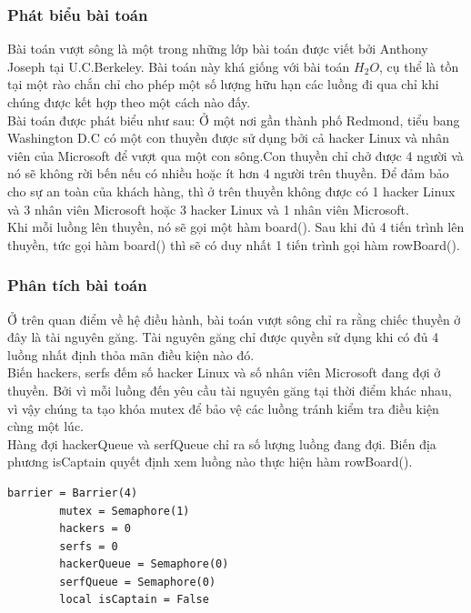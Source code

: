 \documentclass[12pt]{article}
\begin{document}
		\subsubsection{Phát biểu bài toán}
		Bài toán vượt sông là một trong những lớp bài toán được viết bởi Anthony Joseph tại U.C.Berkeley. Bài toán này khá giống với bài toán $H_2O$, cụ thể là tồn tại một rào chắn chỉ cho phép một số lượng hữu hạn các luồng đi qua chỉ khi chúng được kết hợp theo một cách nào đấy.\\
		Bài toán được phát biểu như sau: Ở một nơi gần thành phố Redmond, tiểu bang Washington D.C có một con thuyền được sử dụng bởi cả hacker Linux và nhân viên của Microsoft để vượt qua một con sông.Con thuyền chỉ chở được 4 người và nó sẽ không rời bến nếu có nhiều hoặc ít hơn 4 người trên thuyền. Để đảm bảo cho sự an toàn của khách hàng, thì ở trên thuyền không được có 1 hacker Linux và 3 nhân viên Microsoft hoặc 3 hacker Linux và 1 nhân viên Microsoft.\\
		Khi mỗi luồng lên thuyền, nó sẽ gọi một hàm board(). Sau khi đủ 4 tiến trình lên thuyền, tức gọi hàm board() thì sẽ có duy nhất 1 tiến trình gọi hàm rowBoard().
		\subsubsection{Phân tích bài toán}
		Ở trên quan điểm về hệ điều hành, bài toán vượt sông chỉ ra rằng chiếc thuyền ở đây là tài nguyên găng. Tài nguyên găng chỉ được quyền sử dụng khi có đủ 4 luồng nhất định thỏa mãn điều kiện nào đó.\\
		Biến hackers, serfs đếm số hacker Linux và số nhân viên Microsoft đang đợi ở thuyền. Bởi vì mỗi luồng đến yêu cầu tài nguyên găng tại thời điểm khác nhau, vì vậy chúng ta tạo khóa mutex để bảo vệ các luồng tránh kiểm tra điều kiện cùng một lúc.\\
		Hàng đợi hackerQueue và serfQueue chỉ ra số lượng luồng đang đợi. Biến địa phương isCaptain quyết định xem luồng nào thực hiện hàm rowBoard().\\
     	\begin{lstlisting}[style = Python]
    	barrier = Barrier(4)
		mutex = Semaphore(1)
		hackers = 0
		serfs = 0
		hackerQueue = Semaphore(0)
		serfQueue = Semaphore(0)
		local isCaptain = False
    	\end{lstlisting}
\end{document}
